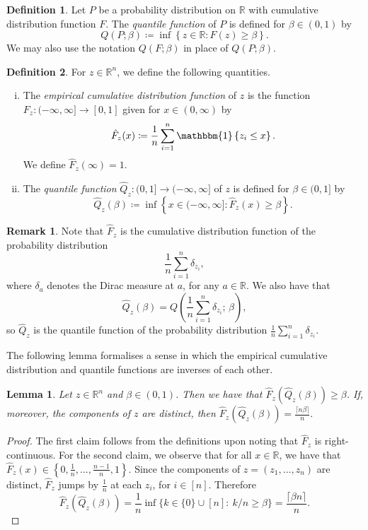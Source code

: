 \documentclass[11pt, titlepage]{article} %
\newcommand{\Ind}[1]{\mathbbm{1}\left\{ #1 \right\}}
\numberwithin{equation}{section}
\newtheorem{lemma}{Lemma}
\theoremstyle{definition}
\newtheorem{definition}{Definition}
\newtheorem{remark}{Remark}
\numberwithin{theorem}{section}
\numberwithin{lemma}{section}
\numberwithin{corollary}{section}
\numberwithin{proposition}{section}
\numberwithin{definition}{section}
\numberwithin{remark}{section}
\begin{document}
\begin{definition}
    Let \(P\) be a probability distribution on \(\mathbb{R}\) with cumulative distribution function \(F\). The \textit{quantile function} of \(P\) is defined for \(\beta \in (0,1)\) by \[Q(P;\beta) \coloneqq \inf\left\{ z \in \mathbb{R}: F(z) \geq \beta \right\}.\] We may also use the notation \(Q(F;\beta)\) in place of \(Q(P;\beta)\).
\label{defn:prob_quantile}
\end{definition}

\begin{definition}
    For \(z \in \mathbb{R}^n\), we define the following quantities. \begin{enumerate}[(i)] \itemsep0em
        \item The \textit{empirical cumulative distribution function} of \(z\) is the function \(F_z: (-\infty, \infty] \to [0,1]\) given for \(x \in (0, \infty)\) by \[\hat{F}_z(x) \coloneqq \frac{1}{n}\sum_{i=1}^n \Ind{z_i \leq x}.  \] We define \(\hat{F}_z(\infty) = 1\).
        \item The \textit{quantile function} \(\hat{Q}_z:(0,1] \to (-\infty, \infty]\) of \(z\) is defined for \(\beta \in (0,1]\) by \[\hat{Q}_z(\beta) \coloneqq \inf \left\{ x \in (-\infty, \infty]: \hat{F}_z(x) \geq \beta \right\}.\]
    \end{enumerate}
\label{defn:empirical_cdfquantile}
\end{definition}

\begin{remark}
    Note that \(\hat{F}_z\) is the cumulative distribution function of the probability distribution \[\frac{1}{n} \sum_{i=1}^n \delta_{z_i},\] where \(\delta_{a}\) denotes the Dirac measure at \(a\), for any \(a \in \mathbb{R}\). We also have that \[\hat{Q}_z(\beta) = Q\left( \frac{1}{n}\sum_{i=1}^n \delta_{z_i} ; \, \beta \right),\] so \(\hat{Q}_z\) is the quantile function of the probability distribution \(\frac{1}{n} \sum_{i=1}^n \delta_{z_i}.\)
\end{remark}

\noindent
The following lemma formalises a sense in which the empirical cumulative distribution and quantile functions are inverses of each other.

\begin{lemma}
    Let \(z \in \mathbb{R}^n\) and \(\beta \in (0,1)\). Then we have that \(\hat{F}_z\left(\hat{Q}_z(\beta)\right) \geq \beta\). If, moreover, the components of \(z\) are distinct, then \(\hat{F}_z\left(\hat{Q}_z(\beta)\right) = \frac{\lceil{n\beta}\rceil}{n}.\)
\label{lemma:cdfquantile}
\end{lemma}
\begin{proof}
    The first claim follows from the definitions upon noting that \(\hat{F}_z\) is right-continuous. For the second claim, we observe that for all \(x \in \mathbb{R}\), we have that \(\hat{F}_z(x) \in \left\{0, \frac{1}{n}, \ldots, \frac{n-1}{n}, 1\right\}\). Since the components of \(z = (z_1, \ldots, z_n)\) are distinct, \(\hat{F}_z\) jumps by \(\frac{1}{n}\) at each \(z_i\), for \(i \in [n]\). Therefore \[\hat{F}_z\left(\hat{Q}_z(\beta)\right) = \frac{1}{n} \inf \{k \in \{0\} \cup [n]: \ k/n \geq \beta \} = \frac{\lceil{\beta n}\rceil}{n}.\]
\end{proof}
\end{document}
